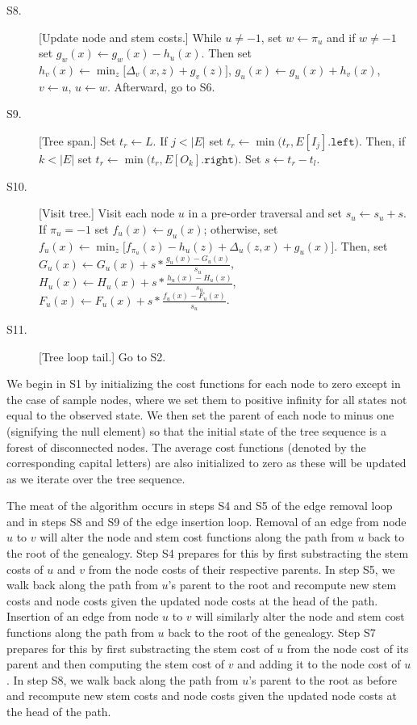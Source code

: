 \begin{description}
\item[S8.] [Update node and stem costs.]
    While $u \neq -1$,
        set $w \leftarrow \pi_u$ and
        if $w \neq -1$
            set $g_w(x) \leftarrow g_w(x) - h_u(x)$.
        Then
        set $h_v(x) \leftarrow \min_{z}\bigl[\Delta_v(x,z) + g_v(z)\bigr]$,
        $g_u(x) \leftarrow g_u(x) + h_v(x)$,
        $v \leftarrow u$, $u \leftarrow w$.
    Afterward, go to S6.

\item[S9.] [Tree span.]
    Set $t_r \leftarrow L$.
    If $j < |E|$ set
        $t_r \leftarrow \min\bigl(t_r, E[I_j].\texttt{left}\bigr)$.
    Then,
    if $k < |E|$ set
        $t_r \leftarrow \min\bigl(t_r, E[O_k].\texttt{right}\bigr)$.
    Set $s \leftarrow t_r - t_l$.

\item[S10.] [Visit tree.]
    Visit each node $u$ in a pre-order traversal and set
    $s_u \leftarrow s_u + s$.
    If $\pi_u = -1$ set
        $f_u(x) \leftarrow g_u(x)$;
    otherwise, set 
        $f_u(x) \leftarrow \min_z \bigl[ f_{\pi_u}(z) - h_u(z) + \Delta_u(z,x) + g_u(x) \bigr]$.
    Then, set
        $G_u(x) \leftarrow G_u(x) + s * \frac{g_u(x) - G_u(x)}{s_u}$,
        $H_u(x) \leftarrow H_u(x) + s * \frac{h_u(x) - H_u(x)}{s_u}$,
        $F_u(x) \leftarrow F_u(x) + s * \frac{f_u(x) - F_u(x)}{s_u}$.

\item[S11.] [Tree loop tail.]
    Go to S2.

\end{description}

We begin in S1 by initializing the cost functions for each node to zero except in
the case of sample nodes, where we set them to positive infinity for all states
not equal to the observed state. We then set the parent of each node to minus
one (signifying the null element) so that the initial state of the tree sequence
is a forest of disconnected nodes. The average cost functions (denoted by the
corresponding capital letters) are also initialized to zero as these will be
updated as we iterate over the tree sequence.

The meat of the algorithm occurs in steps S4 and S5 of the edge removal loop
and in steps S8 and S9 of the edge insertion loop. Removal of an edge from
node $u$ to $v$ will alter the node and stem cost functions along the path from
$u$ back to the root of the genealogy. Step S4 prepares for this by first
substracting the stem costs of $u$ and $v$ from the node costs of their
respective parents. In step S5, we walk back along the path from $u$'s parent to
the root and recompute new stem costs and node costs given the updated node
costs at the head of the path. Insertion of an edge from node $u$ to $v$ will 
similarly alter the node and stem cost functions along the path from
$u$ back to the root of the genealogy. Step S7 prepares for this by first
substracting the stem cost of $u$ from the node cost of its parent and then
computing the stem cost of $v$ and adding it to the node cost of $u$. In step 
S8, we walk back along the path from $u$'s parent to the root as before and 
recompute new stem costs and node costs given the updated node costs at the 
head of the path.

